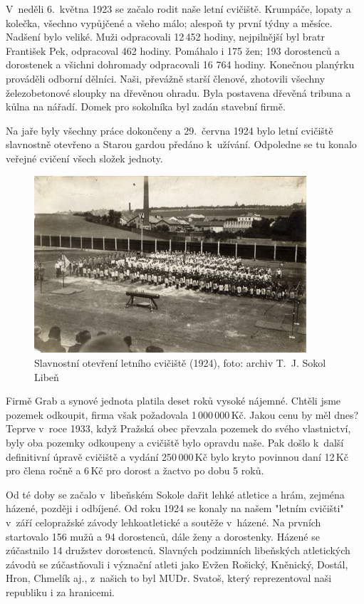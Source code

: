 \documentclass[a5paper, 11pt, twoside]{article}
\begin{document}
V~neděli 6.~května 1923 se začalo rodit naše letní cvičiště. Krumpáče,
lopaty a kolečka, všechno vypůjčené a všeho málo; alespoň ty první týdny
a měsíce. Nadšení bylo veliké. Muži odpracovali 12\,452 hodiny,
nejpilnější byl bratr František Pek, odpracoval 462 hodiny. Pomáhalo i
175 žen; 193 dorostenců a dorostenek a všichni dohromady odpracovali 16
764 hodiny. Konečnou planýrku prováděli odborní dělníci. Naši, převážně
starší členové, zhotovili všechny železobetonové sloupky na dřevěnou
ohradu. Byla postavena dřevěná tribuna a kůlna na nářadí. Domek pro
sokolníka byl zadán stavební firmě.

Na jaře byly všechny práce dokončeny a 29.~června 1924 bylo letní
cvičiště slavnostně otevřeno a Starou gardou předáno k~užívání.
Odpoledne se tu konalo veřejné cvičení všech složek jednoty.

\begin{figure}[h!]
  \centering 
  \includegraphics[width=0.9\textwidth]{img/26_otevreni_cviciste.jpg}
  \caption*{Slavnostní otevření letního cvičiště (1924), foto: archiv T.~J.
  Sokol Libeň}
\end{figure}

Firmě Grab a synové jednota platila deset roků vysoké nájemné. Chtěli
jsme pozemek odkoupit, firma však požadovala 1\,000\,000\,Kč. Jakou cenu by
měl dnes? Teprve v~roce 1933, když Pražská obec převzala pozemek do
svého vlastnictví, byly oba pozemky odkoupeny a cvičiště bylo opravdu
naše. Pak došlo k~další definitivní úpravě cvičiště a vydání 250\,000\,Kč
bylo kryto povinnou daní 12\,Kč pro člena ročně a 6\,Kč pro dorost a
žactvo po dobu 5 roků.

Od té doby se začalo v~libeňském Sokole dařit lehké atletice a hrám,
zejména házené, později i odbíjené. Od roku 1924 se konaly na našem
"letním cvičišti" v~září celopražské závody lehkoatletické a soutěže
v~házené. Na prvních startovalo 156 mužů a 94 dorostenců, dále ženy a
dorostenky. Házené se zúčastnilo 14 družstev dorostenců. Slavných
podzimních libeňských atletických závodů se zúčastňovali i význační
atleti jako Evžen Rošický, Kněnický, Dostál, Hron, Chmelík aj., z~našich
to byl MUDr. Svatoš, který reprezentoval naši republiku i za hranicemi.
\end{document}

